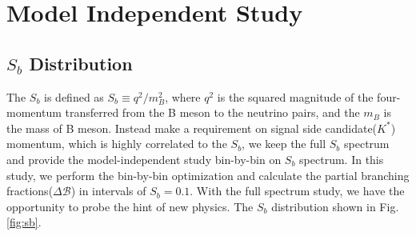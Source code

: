 \chapter{Model Independent Study}
\section{$S_b$ Distribution}
The $S_b$ is defined as $S_b \equiv q^2/m^2_B$, where $q^2$ is the squared magnitude of the four-momentum transferred from the B meson to the neutrino pairs, and the $m_B$ is the mass of B meson.  Instead make a requirement on signal side candidate($K^*$) momentum, which is highly correlated to the $S_b$, we keep the full $S_b$ spectrum and provide the model-independent study bin-by-bin on $S_b$ spectrum. In this study, we perform the bin-by-bin optimization and calculate the partial branching fractions($\Delta \mathcal{B}$) in intervals of $S_b = 0.1$. With the full spectrum study, we have the opportunity to probe the hint of new physics. The $S_b$ distribution shown in Fig. \ref{fig:sb}.
